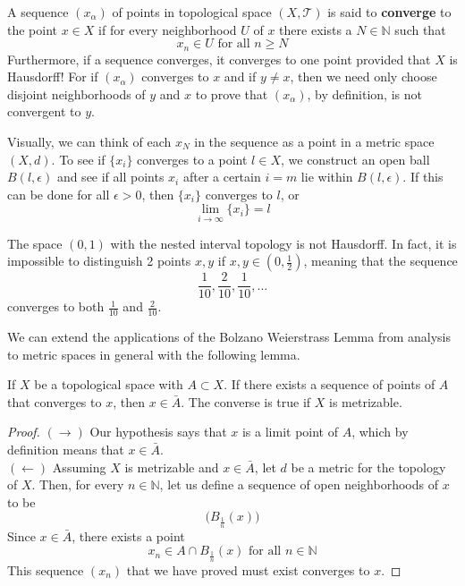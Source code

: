 \documentclass{article}
\begin{document}
    \begin{definition}
    A sequence $(x_\alpha)$ of points in topological space $(X, \mathscr{T})$ is said to \textbf{converge} to the point $x \in X$ if for every neighborhood $U$ of $x$ there exists a $N \in \mathbb{N}$ such that
    \[x_n \in U \text{ for all } n \geq N\]
    Furthermore, if a sequence converges, it converges to one point provided that $X$ is Hausdorff! For if $(x_\alpha)$ converges to $x$ and if $y \neq x$, then we need only choose disjoint neighborhoods of $y$ and $x$ to prove that $(x_\alpha)$, by definition, is not convergent to $y$.
    \end{definition}

    Visually, we can think of each $x_N$ in the sequence as a point in a metric space $(X, d)$. To see if $\{ x_i \}$ converges to a point $l \in X$, we construct an open ball $B(l, \epsilon)$ and see if all points $x_i$ after a certain $i = m$ lie within $B (l, \epsilon)$. If this can be done for all $\epsilon > 0$, then $\{ x_i \}$ converges to $l$, or 
    \[\lim_{i \to \infty} \{ x_i \} = l \]

    \begin{example}
    The space $(0,1)$ with the nested interval topology is not Hausdorff. In fact, it is impossible to distinguish 2 points $x, y$ if $x, y \in (0, \frac{1}{2})$, meaning that the sequence
    \[\frac{1}{10}, \frac{2}{10}, \frac{1}{10}, ...\]
    converges to both $\frac{1}{10}$ and $\frac{2}{10}$.
    \end{example} 

    We can extend the applications of the Bolzano Weierstrass Lemma from analysis to metric spaces in general with the following lemma. 

    \begin{lemma}
    If $X$ be a topological space with $A \subset X$. If there exists a sequence of points of $A$ that converges to $x$, then $x \in \bar{A}$. The converse is true if $X$ is metrizable. 
    \end{lemma}
    \begin{proof}
    $(\rightarrow)$ Our hypothesis says that $x$ is a limit point of $A$, which by definition means that $x \in \bar{A}$. \\
    $(\leftarrow)$ Assuming $X$ is metrizable and $x \in \bar{A}$, let $d$ be a metric for the topology of $X$. Then, for every $n \in \mathbb{N}$, let us define a sequence of open neighborhoods of $x$ to be
    \[\big(B_{\frac{1}{n}} (x) \big)\]
    Since $x \in \bar{A}$, there exists a point 
    \[x_n \in A \cap B_{\frac{1}{n}} (x) \text{ for all } n \in \mathbb{N}\]
    This sequence $(x_n)$ that we have proved must exist converges to $x$. 
    \end{proof}
\end{document}
